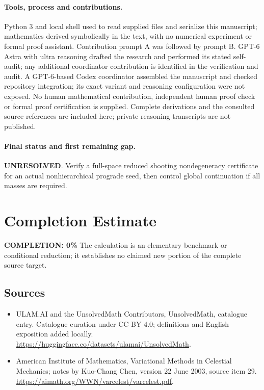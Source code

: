 \documentclass[11pt]{article}
\begin{document}
\paragraph{Tools, process and contributions.}
Python 3 and local shell used to read supplied files and serialize this manuscript; mathematics derived symbolically in the text, with no numerical experiment or formal proof assistant. Contribution prompt A was followed by prompt B. GPT-6 Astra with ultra reasoning drafted the research and performed its stated self-audit; any additional coordinator contribution is identified in the verification and audit. A GPT-6-based Codex coordinator assembled the manuscript and checked repository integration; its exact variant and reasoning configuration were not exposed. No human mathematical contribution, independent human proof check or formal proof certification is supplied. Complete derivations and the consulted source references are included here; private reasoning transcripts are not published.

\paragraph{Final status and first remaining gap.}
\textbf{UNRESOLVED}. Verify a full-space reduced shooting nondegeneracy certificate for an actual nonhierarchical prograde seed, then control global continuation if all masses are required.

\section{Completion Estimate}
\noindent\textbf{COMPLETION: 0\%}
The calculation is an elementary benchmark or conditional reduction; it establishes no claimed new portion of the complete source target.

\subsection{Sources}
\begin{itemize}
\item[\hypertarget{source:statement:1}{S1}] ULAM.AI and the UnsolvedMath Contributors, UnsolvedMath, catalogue entry. Catalogue curation under CC BY 4.0; definitions and English exposition added locally.
\url{https://huggingface.co/datasets/ulamai/UnsolvedMath}.
\item[\hypertarget{source:statement:2}{S2}] American Institute of Mathematics, Variational Methods in Celestial Mechanics; notes by Kuo-Chang Chen, version 22 June 2003, source item 29.
\url{https://aimath.org/WWN/varcelest/varcelest.pdf}.
\end{itemize}
\label{end:statement}
\end{document}
